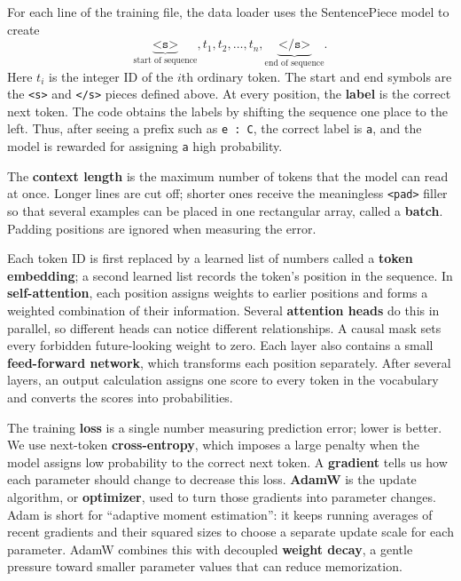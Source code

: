 \documentclass[reqno]{amsart}
\newcommand{\keyterm}[1]{\textbf{\color{agblue}#1}}
\DeclareMathOperator{\1}{\textbf{1}}
\begin{document}
For each line of the training file, the data loader uses the SentencePiece
model to create
\[
  \underbrace{\texttt{<s>}}_{\text{start of sequence}},
  t_1,t_2,\ldots,t_n,
  \underbrace{\texttt{</s>}}_{\text{end of sequence}}.
\]
Here $t_i$ is the integer ID of the $i$th ordinary token.  The start and end
symbols are the \verb|<s>| and \verb|</s>| pieces defined above.  At every
position, the \keyterm{label} is the correct next token.  The code obtains the
labels by shifting the sequence one place to the left.  Thus, after seeing a
prefix such as \verb|e : C|, the correct label is \verb|a|, and the model is
rewarded for assigning \verb|a| high probability.

The \keyterm{context length} is the maximum number of tokens that the model can
read at once.  Longer lines are cut off; shorter ones receive the meaningless
\verb|<pad>| filler so that several examples can be placed in one rectangular
array, called a \keyterm{batch}.  Padding positions are ignored when measuring
the error.

Each token ID is first replaced by a learned list of numbers called a
\keyterm{token embedding}; a second learned list records the token's position
in the sequence.  In \keyterm{self-attention}, each position assigns weights
to earlier positions and forms a weighted combination of their information.
Several \keyterm{attention heads} do this in parallel, so different heads can
notice different relationships.  A causal mask sets every forbidden
future-looking weight to zero.  Each layer also contains a small
\keyterm{feed-forward network}, which transforms each position separately.
After several layers, an output calculation assigns one score to every token
in the vocabulary and converts the scores into probabilities.

The training \keyterm{loss} is a single number measuring prediction error;
lower is better.  We use next-token \keyterm{cross-entropy}, which imposes a
large penalty when the model assigns low probability to the correct next
token.  A \keyterm{gradient} tells us how each parameter should change to
decrease this loss.  \keyterm{AdamW} is the update algorithm, or
\keyterm{optimizer}, used to turn those gradients into parameter changes.
Adam is short for ``adaptive moment estimation'': it keeps running averages of
recent gradients and their squared sizes to choose a separate update scale for
each parameter.  AdamW combines this with decoupled \keyterm{weight decay}, a
gentle pressure toward smaller parameter values that can reduce memorization.
\end{document}
